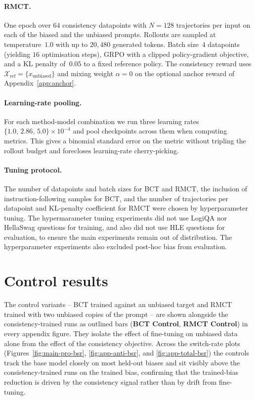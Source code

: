 \documentclass{article}
\begin{document}
\paragraph{RMCT.} One epoch over $64$ consistency datapoints with
$N = 128$ trajectories per input on each of the biased and the
unbiased prompts.
Rollouts are sampled at temperature~$1.0$ with up to $20{,}480$
generated tokens. Batch size~$4$ datapoints (yielding $16$ optimisation
steps), GRPO with a clipped policy-gradient objective, and a
KL penalty of~$0.05$ to a fixed reference policy. The consistency
reward uses $\mathcal{X}_{\text{ref}} = \{x_{\text{unbiased}}\}$ and
mixing weight $\alpha = 0$ on the optional anchor reward of
Appendix~\ref{app:anchor}.

\paragraph{Learning-rate pooling.} For each method-model combination
we run three learning rates~$\{1.0,\,2.86,\,5.0\} \times 10^{-4}$ and
pool checkpoints across them when computing metrics. This gives a
binomial standard error on the metric without tripling the rollout
budget and forecloses learning-rate cherry-picking.

\paragraph{Tuning protocol.} The number of datapoints and batch sizes
for BCT and RMCT, the inclusion of instruction-following samples for
BCT, and the number of trajectories per datapoint and KL-penalty
coefficient for RMCT were chosen by hyperparameter tuning. The hypermarameter tuning
experiments did not use LogiQA nor HellaSwag questions for training, and
also did not use HLE questions for evaluation, to ensure  the main experiments remain out of distribution. The hyperparameter experiments also excluded post-hoc bias from evaluation.

\section{Control results}
\label{app:control-results}

The control variants -- BCT trained against an unbiased target and RMCT
trained with two unbiased copies of the prompt -- are shown alongside
the consistency-trained runs as outlined bars (\textbf{BCT Control},
\textbf{RMCT Control}) in every appendix figure. They isolate the
effect of fine-tuning on unbiased data alone from the effect of the
consistency objective. Across the switch-rate plots
(Figures~\ref{fig:main-pro-bsr}, \ref{fig:app-anti-bsr}, and \ref{fig:app-total-bsr}) the
controls track the base model closely on most held-out biases and
sit visibly above the consistency-trained runs on the trained bias,
confirming that the trained-bias reduction is driven by the
consistency signal rather than by drift from fine-tuning.
\end{document}
